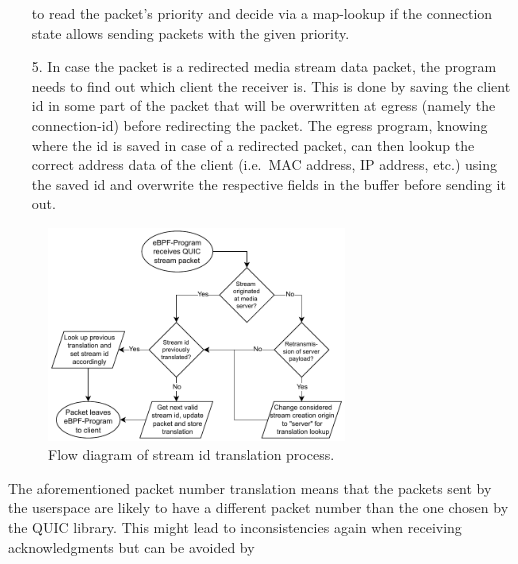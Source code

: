 \begin{enumerate}
                        to read the packet's priority and decide via a map-lookup if the connection 
                        state allows sending packets with the given priority.
    \item[5.] In case the packet is a redirected media stream data packet, the program needs to find out 
            which client the receiver is. 
            This is done by saving the client id in some part of the packet that will be 
            overwritten at egress (namely the connection-id) before redirecting the packet.
            The egress program, knowing where the id is saved in case of a redirected packet, can then
            lookup the correct address data of the client (i.e.~MAC address, IP address, etc.) using 
            the saved id and overwrite the respective fields in the buffer before sending it out.
\end{enumerate}
\vspace{0.5cm}
\begin{figure}[H]
    \centering
    \includegraphics[width=0.7\textwidth]{figures/03_fast_relays/stream-id-translation.drawio.pdf}
    \caption[Stream id translation schematic]{Flow diagram of stream id translation process.}\label{fig:stream-id-translation}
\end{figure}
The aforementioned packet number translation means that the packets sent by the userspace are 
likely to have a different packet number than the one chosen by the QUIC library.
This might lead to inconsistencies again when receiving acknowledgments but can be avoided by 
